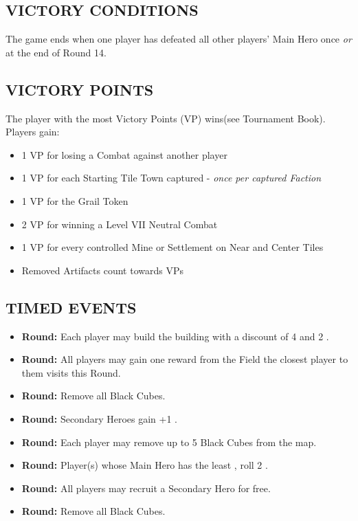 \begin{multicols*}{2}
\subsection*{\MakeUppercase{Victory Conditions}}
The game ends when one player has defeated all other players' Main Hero once \textit{or} at the end of Round 14.

\subsection*{\MakeUppercase{Victory Points}}
The player with the most Victory Points (VP) wins(see Tournament Book). Players gain:

\begin{itemize}
  \item 1 VP for losing a Combat against another player
  \item 1 VP for each Starting Tile Town captured - \textit{once per captured Faction}
  \item 1 VP for the Grail Token
  \item 2 VP for winning a Level VII Neutral Combat
  \item 1 VP for every controlled Mine or Settlement on Near and Center Tiles
  \item Removed Artifacts count towards VPs
\end{itemize}

\subsection*{\MakeUppercase{Timed Events}}

\begin{itemize}
  \item[\textbf{\nth{1}}] \textbf{Round:} Each player may build the  building with a discount of 4  and 2 .
  \item[\textbf{\nth{2}}] \textbf{Round:} All players may gain one reward from the Field the closest player to them visits this Round.
  \item[\textbf{\nth{4}}] \textbf{Round:} Remove all Black Cubes.
  \item[\textbf{\nth{6}}] \textbf{Round:} Secondary Heroes gain +1 .
  \item[\textbf{\nth{8}}] \textbf{Round:} Each player may remove up to 5 Black Cubes from the map.
  \item[\textbf{\nth{9}}] \textbf{Round:} Player(s) whose Main Hero has the least , roll 2 .
  \item[\textbf{\nth{10}}] \textbf{Round:} All players may recruit a Secondary Hero for free.
  \item[\textbf{\nth{12}}] \textbf{Round:} Remove all Black Cubes.
\end{itemize}


\end{multicols*}
